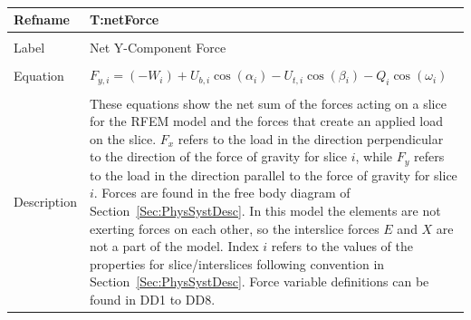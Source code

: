 \documentclass[12pt]{article}
\begin{document}
~\newline
\noindent \begin{minipage}{\textwidth}
\begin{tabular}{p{} p{}}
\toprule \textbf{Refname} & \textbf{T:netForce}
\label{T:netForce}
\\ \midrule \\
Label & Net Y-Component Force
\\ \midrule \\
Equation & ${F_{y,i}}=\left(-W_{i}\right)+{U_{b,i}} \cos\left(\alpha{}_{i}\right)-{U_{t,i}} \cos\left(\beta{}_{i}\right)-Q_{i} \cos\left(\omega{}_{i}\right)$
\\ \midrule \\
Description & These equations show the net sum of the forces acting on a slice for the RFEM model and the forces that create an applied load on the slice. ${F_{x}}$ refers to the load in the direction perpendicular to the direction of the force of gravity for slice $i$, while ${F_{y}}$ refers to the load in the direction parallel to the force of gravity for slice $i$. Forces are found in the free body diagram of Section~\ref{Sec:PhysSystDesc}. In this model the elements are not exerting forces on each other, so the interslice forces $E$ and $X$ are not a part of the model. Index $i$ refers to the values of the properties for slice/interslices following convention in Section~\ref{Sec:PhysSystDesc}. Force variable definitions can be found in DD1 to DD8.
\\ \bottomrule \end{tabular}
\end{minipage}\\
~\newline
\end{document}
